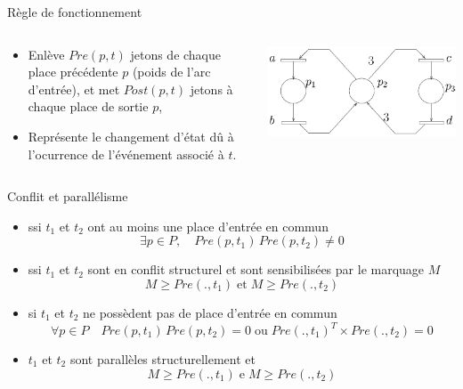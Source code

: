 \documentclass[compress]{beamer}
\begin{document}
\begin{frame}{Règle de fonctionnement}
\begin{columns}
	\begin{column}{.6\linewidth}
		\begin{itemize}
		\item  Enlève $Pre(p,t)$ jetons de chaque place précédente $p$ (poids de l'arc d'entrée), et met $Post(p,t)$ jetons à chaque place de sortie $p$,
		\item  Représente le changement d'état dû à l'ocurrence de l'événement associé à $t$.
		\end{itemize}
	\end{column}
	\begin{column}{.4\linewidth}
		\begin{center}
		\includegraphics[width=\linewidth]{le}
		\end{center}
	\end{column}
\end{columns}
\end{frame}

\begin{frame}{Conflit et parallélisme}
\begin{itemize}
\item {} ssi  $t_1$ et $t_2$ ont au moins une place d'entrée en commun
	$$\exists p \in P, \quad Pre(p,t_1) \, Pre(p,t_2) \neq 0$$
\item {} ssi $t_1$ et $t_2$ sont en conflit structurel et sont sensibilisées par le marquage $M$
	$$M \geq Pre(.,t_1) \; \mbox{et} \; M \geq  Pre(.,t_2)$$
\item {} si $t_1$ et $t_2$ ne possèdent pas de place d'entrée en commun
	$$\forall p \in P \quad Pre(p,t_1) \, Pre(p,t_2) = 0  \;
	\mbox{ou} \; Pre(.,t_1)^T \times Pre(.,t_2) = 0$$
\item {} $t_1$ et $t_2$ sont parallèles structurellement et
$$M \geq Pre(.,t_1) \; \mbox{e} \; M \geq Pre(.,t_2)$$
\end{itemize}
\end{frame}
\end{document}
